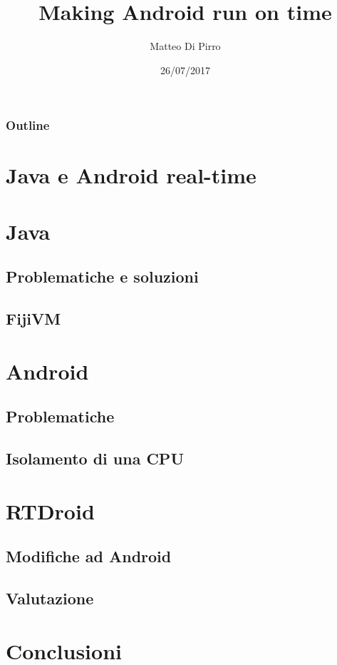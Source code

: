 \documentclass{beamer}
\title{Making Android run on time}
\subtitle{ }
\author{Matteo Di Pirro}
\date{26/07/2017}
\institute{Università degli Studi di Padova}
\begin{document}
\newcommand{\turnOffNumbers}{true} %

\begin{frame}[noframenumbering]
\titlepage
\end{frame}

\let\turnOffNumbers\empty
\begin{frame}
	\frametitle{Outline}
	\tableofcontents
\end{frame}

\section{Java e Android real-time}


\section{Java}
\subsection{Problematiche e soluzioni}


\subsection{FijiVM}




\section{Android}
\subsection{Problematiche}



\subsection{Isolamento di una CPU}




\section{RTDroid}

\subsection{Modifiche ad Android}






\subsection{Valutazione}



\section{Conclusioni}




\appendix
\makethanks
\renewcommand{\turnOffNumbers}{true} %
\end{document}
